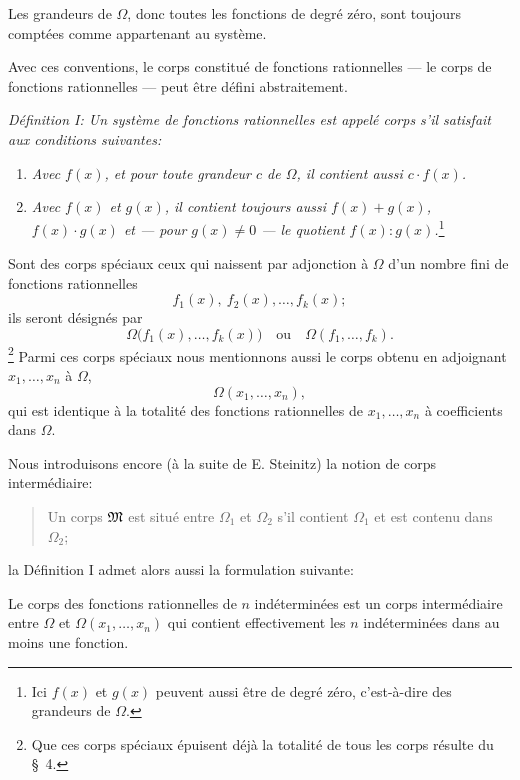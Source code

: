 \documentclass[11pt]{article}
\begin{document}
Les grandeurs de $\Omega$, donc toutes les fonctions de degré zéro, sont toujours comptées comme appartenant au système.

Avec ces conventions, le corps constitué de fonctions rationnelles --- le corps de fonctions rationnelles --- peut être défini abstraitement.

\emph{Définition I: Un système de fonctions rationnelles est appelé corps s'il satisfait aux conditions suivantes:}
\begin{enumerate}
\item \emph{Avec $f(x)$, et pour toute grandeur $c$ de $\Omega$, il contient aussi $c\cdot f(x)$.}
\item \emph{Avec $f(x)$ et $g(x)$, il contient toujours aussi $f(x)+g(x)$, $f(x)\cdot g(x)$ et --- pour $g(x)\ne0$ --- le quotient $f(x):g(x)$.}\footnote{Ici $f(x)$ et $g(x)$ peuvent aussi être de degré zéro, c'est-à-dire des grandeurs de $\Omega$.}
\end{enumerate}

Sont des corps spéciaux ceux qui naissent par adjonction à $\Omega$ d'un nombre fini de fonctions rationnelles
\[
  f_1(x),\ f_2(x),\ldots, f_k(x);
\]
ils seront désignés par
\[
  \Omega\bigl(f_1(x),\ldots,f_k(x)\bigr)
  \quad\text{ou}\quad
  \Omega(f_1,\ldots,f_k).
\]
\footnote{Que ces \og{}corps spéciaux\fg{} épuisent déjà la totalité de tous les corps résulte du \S\ 4.}
Parmi ces corps spéciaux nous mentionnons aussi le corps obtenu en adjoignant $x_1,\ldots,x_n$ à $\Omega$,
\[
  \Omega(x_1,\ldots,x_n),
\]
qui est identique à la totalité des fonctions rationnelles de $x_1,\ldots,x_n$ à coefficients dans $\Omega$.

Nous introduisons encore (à la suite de E. Steinitz) la notion de corps intermédiaire:
\begin{quote}
\og{}Un corps $\mathfrak{M}$ est situé entre $\Omega_1$ et $\Omega_2$ s'il contient $\Omega_1$ et est contenu dans $\Omega_2$;\fg{}
\end{quote}
la Définition I admet alors aussi la formulation suivante:

Le corps des fonctions rationnelles de $n$ indéterminées est un corps intermédiaire entre $\Omega$ et $\Omega(x_1,\ldots,x_n)$ qui contient effectivement les $n$ indéterminées dans au moins une fonction.
\end{document}
